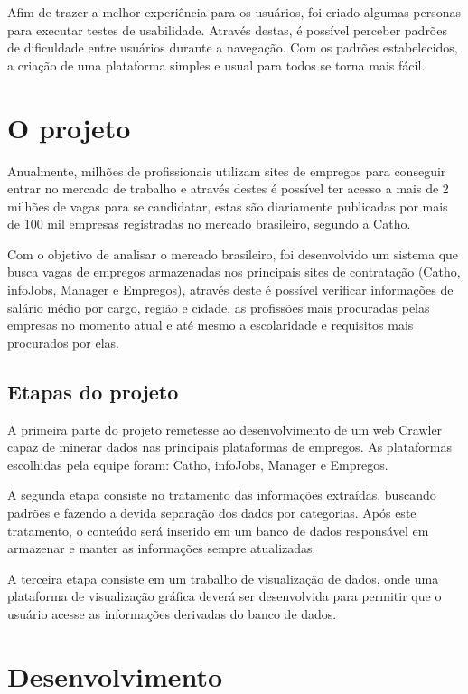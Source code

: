 \documentclass[12pt]{article}
\begin{document}
Afim de trazer a melhor experiência para os usuários, foi criado algumas personas para executar testes de usabilidade.  Através destas, é possível perceber padrões de dificuldade entre usuários durante a navegação. Com os padrões estabelecidos, a criação de uma plataforma simples e usual para todos se torna mais fácil.

\section{O projeto}

Anualmente, milhões de profissionais utilizam sites de empregos para conseguir entrar no mercado de trabalho e através destes é possível ter acesso a mais de 2 milhões de vagas para se candidatar, estas são diariamente publicadas por mais de 100 mil empresas registradas no mercado brasileiro, segundo a Catho.

Com o objetivo de analisar o mercado brasileiro, foi desenvolvido um sistema que busca vagas de empregos armazenadas nos principais sites de contratação (Catho, infoJobs, Manager e Empregos), através deste é possível verificar informações de salário médio por cargo, região e cidade, as profissões mais procuradas pelas empresas no momento atual e até mesmo a escolaridade e requisitos mais procurados por elas.

\subsection{Etapas do projeto} \label{sec:firstpage}

A primeira parte do projeto remetesse ao desenvolvimento de um web Crawler capaz de minerar dados nas principais plataformas de empregos. As plataformas escolhidas pela equipe foram: Catho, infoJobs, Manager e Empregos.

A segunda etapa consiste no tratamento das informações extraídas,  buscando padrões e fazendo a devida separação dos dados por categorias. Após este tratamento, o conteúdo será inserido em um banco de dados responsável em armazenar e manter as informações sempre atualizadas.

A terceira etapa consiste em um trabalho de visualização de dados, onde uma plataforma de visualização gráfica deverá ser desenvolvida para permitir que o usuário acesse as informações derivadas do banco de dados.

\section{Desenvolvimento}\label{sec:figs}
\end{document}

